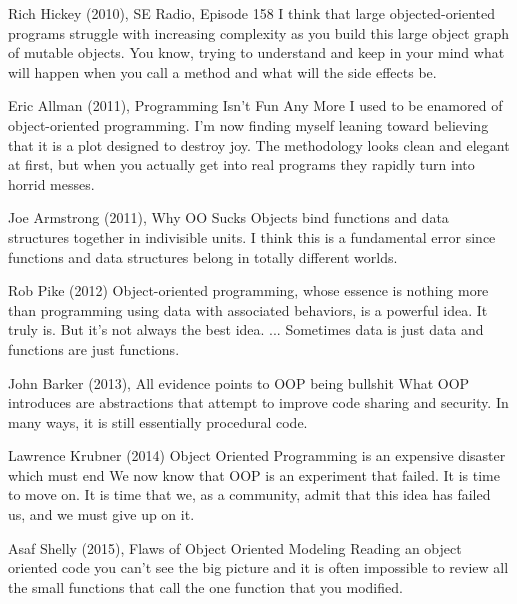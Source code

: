 \documentclass[12pt]{book}
\begin{document}
\begin{kodequote}{Rich Hickey (2010), SE Radio, Episode 158}
	I think that large objected-oriented programs struggle with increasing complexity as you build this large object graph of mutable objects. You know, trying to understand and keep in your mind what will happen when you call a method and what will the side effects be.
\end{kodequote}

\begin{kodequote}{Eric Allman (2011), Programming Isn't Fun Any More}
	I used to be enamored of object-oriented programming. I'm now finding myself leaning toward believing that it is a plot designed to destroy joy. The methodology looks clean and elegant at first, but when you actually get into real programs they rapidly turn into horrid messes.
\end{kodequote}

\begin{kodequote}{Joe Armstrong (2011), Why OO Sucks}
	Objects bind functions and data structures together in indivisible units. I think this is a fundamental error since functions and data structures belong in totally different worlds.
\end{kodequote}

\begin{kodequote}{Rob Pike (2012)}
	Object-oriented programming, whose essence is nothing more than programming using data with associated behaviors, is a powerful idea. It truly is. But it's not always the best idea. ... Sometimes data is just data and functions are just functions.
\end{kodequote}

\begin{kodequote}{John Barker (2013), All evidence points to OOP being bullshit}
	What OOP introduces are abstractions that attempt to improve code sharing and security. In many ways, it is still essentially procedural code.
\end{kodequote}

\begin{kodequote}{Lawrence Krubner (2014)}
	Object Oriented Programming is an expensive disaster which must end
	We now know that OOP is an experiment that failed. It is time to move on. It is time that we, as a community, admit that this idea has failed us, and we must give up on it.
\end{kodequote}

\begin{kodequote}{Asaf Shelly (2015), Flaws of Object Oriented Modeling}
	Reading an object oriented code you can't see the big picture and it is often impossible to review all the small functions that call the one function that you modified.
\end{kodequote}
\end{document}
